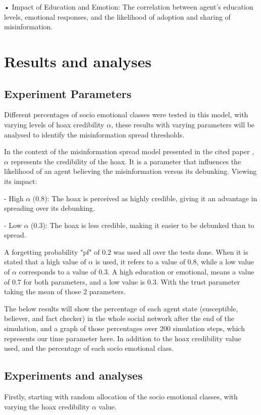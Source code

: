 \documentclass[twocolumn, a4paper, 12pt]{article}
\begin{document}
• Impact of Education and Emotion: The correlation between agent's education
levels, emotional responses, and the likelihood of adoption and sharing of misinformation.

\section{Results and analyses}
\subsection{Experiment Parameters}
Different percentages of socio emotional classes were tested in this model, with varying levels of hoax credibility $\alpha$, these results with varying parameters will be analysed to identify the misinformation spread thresholds.

In the context of the misinformation spread model presented in the cited paper \cite{simulation}, $\alpha$ represents the credibility of the hoax. It is a parameter that influences the likelihood of an agent believing the misinformation versus its debunking. Viewing its impact:

- High $\alpha$ (0.8): The hoax is perceived as highly credible, giving it an advantage in spreading over its debunking.

- Low $\alpha$ (0.3): The hoax is less credible, making it easier to be debunked than to spread.

A forgetting probability "pf" of 0.2 was used all over the tests done. When it is stated that a high value of $\alpha$ is used, it refers to a value of 0.8, while a low value of $\alpha$ corresponds to a value of 0.3. A high education or emotional, means a value of 0.7 for both parameters, and a low value is 0.3. With the trust parameter taking the mean of those 2 parameters.

The below results will show the percentage of each agent state (susceptible, believer, and fact checker) in the whole social network after the end of the simulation, and a graph of those percentages over 200 simulation steps, which represents our time parameter here. In addition to the hoax credibility value used, and the percentage of each socio emotional class.

\subsection{Experiments and analyses}
Firstly, starting with random allocation of the socio emotional classes, with varying the hoax credibility $\alpha$ value.
\end{document}

